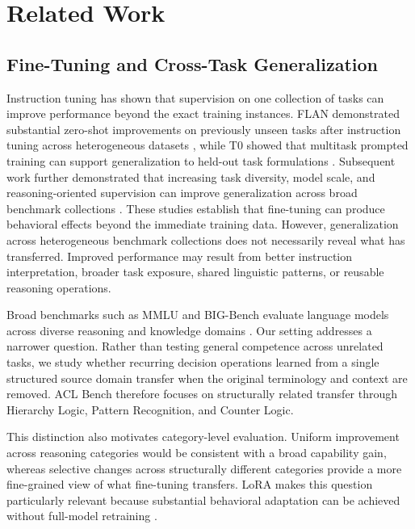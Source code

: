 \section{Related Work}
\label{sec:related_work}

\subsection{Fine-Tuning and Cross-Task Generalization}
\label{sec:rw_transfer}

Instruction tuning has shown that supervision on one collection of tasks can improve performance beyond the exact training instances. FLAN demonstrated substantial zero-shot improvements on previously unseen tasks after instruction tuning across heterogeneous datasets \cite{wei2022finetuned}, while T0 showed that multitask prompted training can support generalization to held-out task formulations \cite{sanh2022multitask}. Subsequent work further demonstrated that increasing task diversity, model scale, and reasoning-oriented supervision can improve generalization across broad benchmark collections \cite{chung2024scaling}. These studies establish that fine-tuning can produce behavioral effects beyond the immediate training data. However, generalization across heterogeneous benchmark collections does not necessarily reveal what has transferred. Improved performance may result from better instruction interpretation, broader task exposure, shared linguistic patterns, or reusable reasoning operations.

Broad benchmarks such as MMLU and BIG-Bench evaluate language models across diverse reasoning and knowledge domains \cite{hendrycks2021measuring,srivastava2022beyond}. Our setting addresses a narrower question. Rather than testing general competence across unrelated tasks, we study whether recurring decision operations learned from a single structured source domain transfer when the original terminology and context are removed. ACL Bench therefore focuses on structurally related transfer through Hierarchy Logic, Pattern Recognition, and Counter Logic.

This distinction also motivates category-level evaluation. Uniform improvement across reasoning categories would be consistent with a broad capability gain, whereas selective changes across structurally different categories provide a more fine-grained view of what fine-tuning transfers. LoRA makes this question particularly relevant because substantial behavioral adaptation can be achieved without full-model retraining \cite{hu2022lora}.

